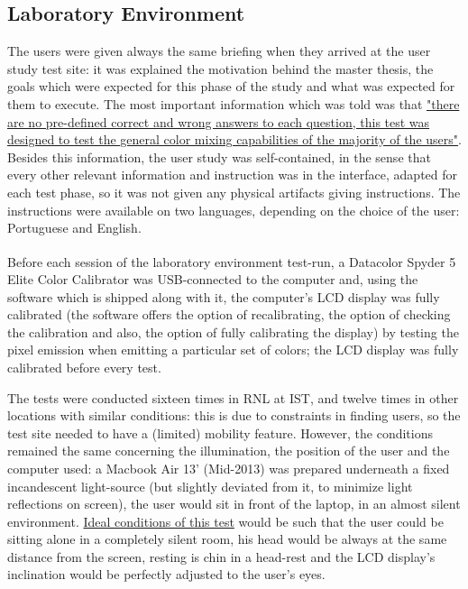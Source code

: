 \subsection{Laboratory Environment}
%
The users were given always the same briefing when they arrived at the user study test site: it was explained the motivation behind the master
thesis, the goals which were expected for this phase of the study and what was expected for them to execute. The most important information which
was told was that \ul{"there are no pre-defined correct and wrong answers to each question, this test was designed to test the general
color mixing capabilities of the majority of the users"}. Besides this information, the user study was self-contained, in the sense that
every other relevant information and instruction was in the interface, adapted for each test phase, so it was not given any physical artifacts
giving instructions. The instructions were available on two languages, depending on the choice of the user: Portuguese and English. \par
%
Before each session of the laboratory environment test-run, a Datacolor\textsuperscript{\textregistered} Spyder 5 Elite Color Calibrator was USB-connected to the computer and, using
the software which is shipped along with it, the computer's LCD display was fully calibrated (the software offers the option of recalibrating,
the option of checking the calibration and also, the option of fully calibrating the display) by testing the pixel emission when emitting a particular
set of colors; the LCD display was fully calibrated before every test. \par
%
The tests were conducted sixteen times in \gls{RNL} at \gls{IST}, and twelve times in other locations with similar conditions:
this is due to constraints in finding users, so the test site needed to have a (limited) mobility feature. However, the conditions remained
the same concerning the illumination, the position of the user and the computer used: a Macbook Air 13' (Mid-2013) was prepared underneath
a fixed incandescent light-source (but slightly deviated from it, to minimize light reflections on screen), the user would sit in front
of the laptop, in an almost silent environment. \ul{Ideal conditions of this test} would be such that the user could be sitting alone in a completely
silent room, his head would be always at the same distance from the screen, resting is chin in a head-rest and the LCD display's inclination would be perfectly
adjusted to the user's eyes.
%
